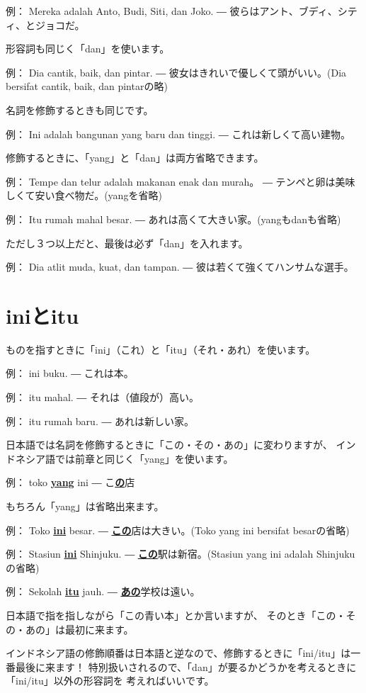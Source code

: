 \documentclass[uplatex]{jsarticle}
\theoremstyle{definition}
\newcommand{\example}[2]{
例： #1 ― #2
}
\newcommand{\bu}[1]{\underline{\textbf{#1}}}
\newcommand{\bi}[1]{\bu{#1}}
\newcommand{\bj}[1]{\bu{#1}}
\begin{document}
\example{Mereka adalah Anto, Budi, Siti, dan Joko.}{彼らはアント、ブディ、シティ、とジョコだ。}

形容詞も同じく「dan」を使います。

\example{Dia cantik, baik, dan pintar.}{彼女はきれいで優しくて頭がいい。(Dia bersifat cantik, baik, dan pintarの略)}

名詞を修飾するときも同じです。

\example{Ini adalah bangunan yang baru dan tinggi.}{これは新しくて高い建物。}

修飾するときに、「yang」と「dan」は両方省略できます。

\example{Tempe dan telur adalah makanan enak dan murah。}{テンペと卵は美味しくて安い食べ物だ。(yangを省略)}

\example{Itu rumah mahal besar.}{あれは高くて大きい家。(yangもdanも省略)}

ただし３つ以上だと、最後は必ず「dan」を入れます。

\example{Dia atlit muda, kuat, dan tampan.}{彼は若くて強くてハンサムな選手。}

\section{iniとitu}

ものを指すときに「ini」（これ）と「itu」（それ・あれ）を使います。

\example{ini buku.}{これは本。}

\example{itu mahal.}{それは（値段が）高い。}

\example{itu rumah baru.}{あれは新しい家。}

日本語では名詞を修飾するときに「この・その・あの」に変わりますが、
インドネシア語では前章と同じく「yang」を使います。

\example{toko \bi{yang} ini}{こ\bj{の}店}

もちろん「yang」は省略出来ます。

\example{Toko \bi{ini} besar.}{\bj{この}店は大きい。(Toko yang ini bersifat besarの省略)}

\example{Stasiun \bi{ini} Shinjuku.}{\bj{この}駅は新宿。(Stasiun yang ini adalah Shinjukuの省略)}

\example{Sekolah \bi{itu} jauh.}{\bj{あの}学校は遠い。}

日本語で指を指しながら「この青い本」とか言いますが、
そのとき「この・その・あの」は最初に来ます。

インドネシア語の修飾順番は日本語と逆なので、修飾するときに「ini/itu」は一番最後に来ます！
特別扱いされるので、「dan」が要るかどうかを考えるときに「ini/itu」以外の形容詞を
考えればいいです。
\end{document}
